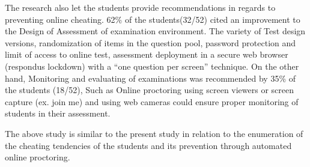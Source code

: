 The research also let the students provide recommendations in regards to preventing online cheating.
62\% of the students(32/52) cited an improvement to the Design of Assessment of examination environment.
The variety of Test design versions, randomization of items in the question pool, password protection and limit of access to online test, assessment deployment in a secure web browser (respondus lockdown) with a “one question per screen” technique.
On the other hand, Monitoring and evaluating of examinations was recommended by 35\% of the students (18/52), Such as Online proctoring using screen viewers or screen capture (ex. join me) and using web cameras could ensure proper monitoring of students in their assessment.

The above study is similar to the present study in relation to the enumeration of the cheating tendencies of the students and its prevention through automated online proctoring.

